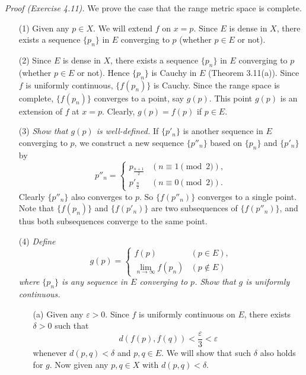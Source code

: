 \documentclass{article}
\begin{document}
\emph{Proof (Exercise 4.11).}
We prove the case that the range metric space is complete.
\begin{enumerate}
\item[(1)]
Given any $p \in X$. We will extend $f$ on $x = p$.
Since $E$ is dense in $X$, there exists a sequence $\{p_n\}$ in $E$ converging to $p$
(whether $p \in E$ or not).

\item[(2)]
Since $E$ is dense in $X$, there exists a sequence $\{p_n\}$ in $E$ converging to $p$
(whether $p \in E$ or not).
Hence $\{p_n\}$ is Cauchy in $E$ (Theorem 3.11(a)).
Since $f$ is uniformly continuous, $\{f(p_n)\}$ is Cauchy.
Since the range space is complete, $\{f(p_n)\}$ converges to a point, say $g(p)$.
This point $g(p)$ is an extension of $f$ at $x = p$.
Clearly, $g(p) = f(p)$ if $p \in E$.

\item[(3)]
\emph{Show that $g(p)$ is well-defined.}
If $\{p'_n\}$ is another sequence in $E$ converging to $p$,
we construct a new sequence $\{p''_n\}$ based on $\{p_n\}$ and $\{p'_n\}$ by
\begin{equation*}
  p''_n =
    \begin{cases}
      p_{\frac{n+1}{2}} & (n \equiv 1 \pmod{2}), \\
      p'_{\frac{n}{2}}  & (n \equiv 0 \pmod{2}).
    \end{cases}
\end{equation*}
Clearly $\{p''_n\}$ also converges to $p$.
So $\{f(p''_n)\}$ converges to a single point.
Note that $\{f(p_n)\}$ and $\{f(p'_n)\}$ are two subsequences of $\{f(p''_n)\}$,
and thus both subsequences converge to the same point.

\item[(4)]
\emph{Define
\begin{equation*}
  g(p) =
    \begin{cases}
      f(p) & (p \in E), \\
      \lim_{n \to \infty} f(p_n)
        & (p \not\in E)
    \end{cases}
\end{equation*}
where $\{p_n\}$ is any sequence in $E$ converging to $p$.
Show that $g$ is uniformly continuous.}
  \begin{enumerate}
  \item[(a)]
  Given any $\varepsilon > 0$.
  Since $f$ is uniformly continuous on $E$,
  there exists $\delta > 0$ such that
  \[
    d(f(p),f(q)) < \frac{\varepsilon}{3} < \varepsilon
  \]
  whenever $d(p,q) < \delta$ and $p, q \in E$.
  We will show that such $\delta$ also holds for $g$.
  Now given any $p, q \in X$ with $d(p,q) < \delta$.


\end{enumerate}
\end{enumerate}
\end{document}
